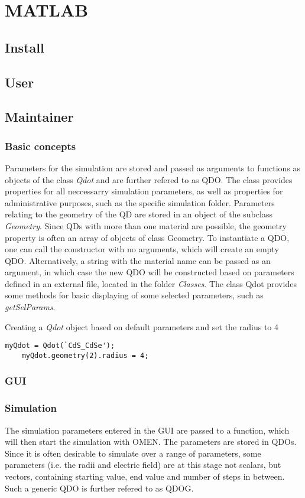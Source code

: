 \chapter{MATLAB}
\section{Install}
\section{User}
\section{Maintainer}
\subsection{Basic concepts}
Parameters for the simulation are stored and passed as arguments to functions as objects of the class \textit{Qdot} and are further refered to as QDO. The class provides properties for all neccessarry simulation parameters, as well as properties for administrative purposes, such as the specific simulation folder. Parameters relating to the geometry of the QD are stored in an object of the subclass \textit{Geometry}. Since QDs with more than one material are possible, the geometry property is often an array of objects of class Geometry. To instantiate a QDO, one can call the constructor with no arguments, which will create an empty QDO. Alternatively, a string with the material name can be passed as an argument, in which case the new QDO will be constructed based on parameters defined in an external file, located in the folder \textit{Classes}. The class Qdot provides some methods for basic displaying of some selected parameters, such as \textit{getSelParams}.\\

\begin{EXAMPLE}
Creating a \textit{Qdot} object based on default parameters and set the radius to 4
\begin{lstlisting}[frame=none]
	myQdot = Qdot(`CdS_CdSe');
	myQdot.geometry(2).radius = 4;\end{lstlisting}
\end{EXAMPLE}
\subsection{GUI}
\subsection{Simulation}
The simulation parameters entered in the GUI are passed to a function, which will then start the simulation with OMEN. The parameters are stored in QDOs. Since it is often desirable to simulate over a range of parameters, some parameters (i.e. the radii and electric field) are at this stage not scalars, but vectors, containing starting value, end value and number of steps in between. Such a generic QDO is further refered to as QDOG.\\

